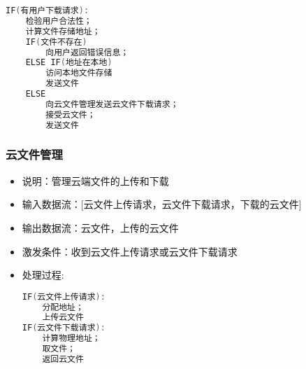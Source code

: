 \begin{itemize}
\begin{itemize}
\begin{lstlisting}[language=C, caption=文件管理, label={code:first-code}]
IF(有用户下载请求):
    检验用户合法性；
    计算文件存储地址；
    IF(文件不存在) 
        向用户返回错误信息；
    ELSE IF(地址在本地)
        访问本地文件存储
        发送文件
    ELSE 
        向云文件管理发送云文件下载请求；
        接受云文件；
        发送文件
\end{lstlisting}
            \end{itemize}    
            \subsubsection{云文件管理}
            \begin{itemize}
                \item 说明：管理云端文件的上传和下载
                \item 输入数据流：[云文件上传请求，云文件下载请求，下载的云文件]
                \item 输出数据流：云文件，上传的云文件
                \item 激发条件：收到云文件上传请求或云文件下载请求
                \item 处理过程: 
\begin{lstlisting}[language=C, caption=云文件管理, label={code:first-code}]
IF(云文件上传请求):
    分配地址；
    上传云文件
IF(云文件下载请求):
    计算物理地址；
    取文件；
    返回云文件
\end{lstlisting}
            \end{itemize}

\end{itemize}
